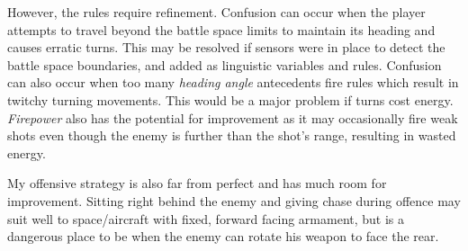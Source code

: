 However, the rules require refinement. Confusion can occur when the player attempts to travel beyond the battle space limits to maintain its heading and causes erratic turns. This may be resolved if sensors were in place to detect the battle space boundaries, and added as linguistic variables and rules. Confusion can also occur when too many \emph{heading angle} antecedents fire rules which result in twitchy turning movements. This would be a major problem if turns cost energy. \emph{Firepower} also has the potential for improvement as it may occasionally fire weak shots even though the enemy is further than the shot's range, resulting in wasted energy.

My offensive strategy is also far from perfect and has much room for improvement. Sitting right behind the enemy and giving chase during offence may suit well to space/aircraft with fixed, forward facing armament, but is a dangerous place to be when the enemy can rotate his weapon to face the rear.
